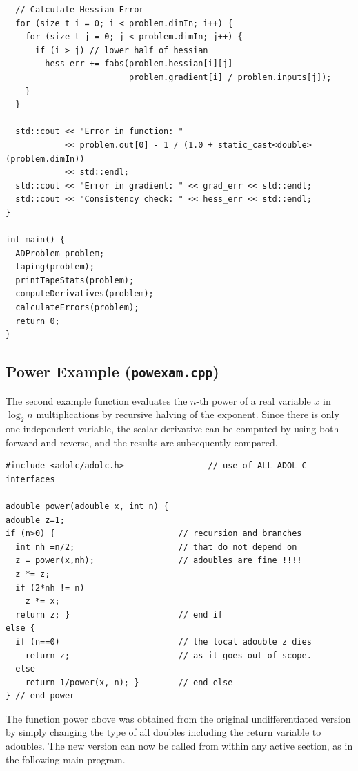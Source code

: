 \documentclass[11pt,twoside]{article}
\begin{document}
\begin{verbatim}
  // Calculate Hessian Error
  for (size_t i = 0; i < problem.dimIn; i++) {
    for (size_t j = 0; j < problem.dimIn; j++) {
      if (i > j) // lower half of hessian
        hess_err += fabs(problem.hessian[i][j] -
                         problem.gradient[i] / problem.inputs[j]);
    }
  }

  std::cout << "Error in function: "
            << problem.out[0] - 1 / (1.0 + static_cast<double>(problem.dimIn))
            << std::endl;
  std::cout << "Error in gradient: " << grad_err << std::endl;
  std::cout << "Consistency check: " << hess_err << std::endl;
}

int main() {
  ADProblem problem;
  taping(problem);
  printTapeStats(problem);
  computeDerivatives(problem);
  calculateErrors(problem);
  return 0;
}
\end{verbatim}
%
\subsection{Power Example ({\tt powexam.cpp})}
%
The second example function evaluates the $n$-th power of a real
variable $x$ in 
$\log_2 n$ multiplications by recursive halving of the exponent. Since
there is only one independent variable, the scalar derivative can be
computed by 
using both {\sf forward} and {\sf reverse}, and the
results are subsequently compared.
\begin{verbatim}
#include <adolc/adolc.h>                 // use of ALL ADOL-C interfaces

adouble power(adouble x, int n) {
adouble z=1;
if (n>0) {                         // recursion and branches
  int nh =n/2;                     // that do not depend on
  z = power(x,nh);                 // adoubles are fine !!!!
  z *= z;
  if (2*nh != n) 
    z *= x;
  return z; }                      // end if
else {
  if (n==0)                        // the local adouble z dies
    return z;                      // as it goes out of scope.
  else 
    return 1/power(x,-n); }        // end else
} // end power
\end{verbatim}
The function {\sf power} above was obtained from the original 
undifferentiated version by simply changing the type of all 
{\sf double}s including the return variable to {\sf adouble}s. The new version
can now be called from within any active section, as in the following
main program. 
\end{document}
